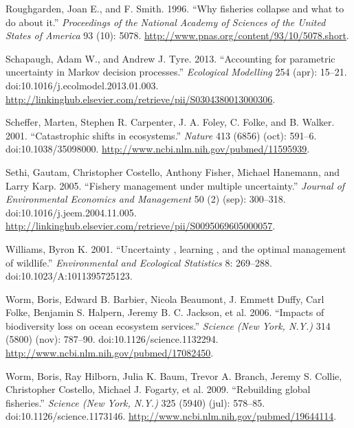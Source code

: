 \documentclass[author-year, review]{elsarticle} %
\begin{document}
Roughgarden, Joan E., and F. Smith. 1996. ``Why fisheries collapse and
what to do about it.'' \emph{Proceedings of the National Academy of
Sciences of the United States of America} 93 (10): 5078.
\url{http://www.pnas.org/content/93/10/5078.short}.

Schapaugh, Adam W., and Andrew J. Tyre. 2013. ``Accounting for
parametric uncertainty in Markov decision processes.'' \emph{Ecological
Modelling} 254 (apr): 15--21. doi:10.1016/j.ecolmodel.2013.01.003.
\url{http://linkinghub.elsevier.com/retrieve/pii/S0304380013000306}.

Scheffer, Marten, Stephen R. Carpenter, J. A. Foley, C. Folke, and B.
Walker. 2001. ``Catastrophic shifts in ecosystems.'' \emph{Nature} 413
(6856) (oct): 591--6. doi:10.1038/35098000.
\url{http://www.ncbi.nlm.nih.gov/pubmed/11595939}.

Sethi, Gautam, Christopher Costello, Anthony Fisher, Michael Hanemann,
and Larry Karp. 2005. ``Fishery management under multiple uncertainty.''
\emph{Journal of Environmental Economics and Management} 50 (2) (sep):
300--318. doi:10.1016/j.jeem.2004.11.005.
\url{http://linkinghub.elsevier.com/retrieve/pii/S0095069605000057}.

Williams, Byron K. 2001. ``Uncertainty , learning , and the optimal
management of wildlife.'' \emph{Environmental and Ecological Statistics}
8: 269--288. doi:10.1023/A:1011395725123.

Worm, Boris, Edward B. Barbier, Nicola Beaumont, J. Emmett Duffy, Carl
Folke, Benjamin S. Halpern, Jeremy B. C. Jackson, et al. 2006. ``Impacts
of biodiversity loss on ocean ecosystem services.'' \emph{Science (New
York, N.Y.)} 314 (5800) (nov): 787--90. doi:10.1126/science.1132294.
\url{http://www.ncbi.nlm.nih.gov/pubmed/17082450}.

Worm, Boris, Ray Hilborn, Julia K. Baum, Trevor A. Branch, Jeremy S.
Collie, Christopher Costello, Michael J. Fogarty, et al. 2009.
``Rebuilding global fisheries.'' \emph{Science (New York, N.Y.)} 325
(5940) (jul): 578--85. doi:10.1126/science.1173146.
\url{http://www.ncbi.nlm.nih.gov/pubmed/19644114}.
\end{document}
